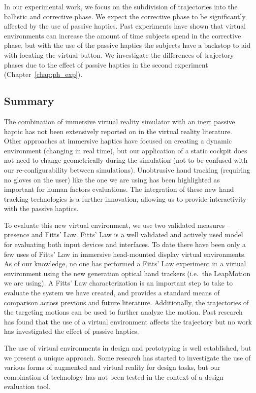 In our experimental work, we focus on the subdivision of trajectories into the ballistic and corrective phase.
We expect the corrective phase to be significantly affected by the use of passive haptics.
Past experiments have shown that virtual environments can increase the amount of time subjects spend in the corrective phase, but with the use of the passive haptics the subjects have a backstop to aid with locating the virtual button.
We investigate the differences of trajectory phases due to the effect of passive haptics in the second experiment (Chapter~\ref{chap:ph_exp}).

\subsection{Summary}
\label{summary}

The combination of immersive virtual reality simulator with an inert passive haptic has not been extensively reported on in the virtual reality literature.
Other approaches at immersive haptics have focused on creating a dynamic environment (changing in real time), but our application of a static cockpit does not need to change geometrically during the simulation (not to be confused with our re-configurability between simulations).
Unobtrusive hand tracking (requiring no gloves on the user) like the one we are using has been highlighted as important for human factors evaluations.
The integration of these new hand tracking technologies is a further innovation, allowing us to provide interactivity with the passive haptics.

To evaluate this new virtual environment, we use two validated measures -- presence and Fitts' Law.
Fitts' Law is a well validated and actively used model for evaluating both input devices and interfaces.
To date there have been only a few uses of Fitts' Law in immersive head-mounted display virtual environments.
As of our knowledge, no one has performed a Fitts' Law experiment in a virtual environment using the new generation optical hand trackers (i.e.\ the LeapMotion we are using).
A Fitts' Law characterization is an important step to take to evaluate the system we have created, and provides a standard means of comparison across previous and future literature.
Additionally, the trajectories of the targeting motions can be used to further analyze the motion.
Past research has found that the use of a virtual environment affects the trajectory but no work has investigated the effect of passive haptics.

The use of virtual environments in design and prototyping is well established, but we present a unique approach.
Some research has started to investigate the use of various forms of augmented and virtual reality for design tasks, but our combination of technology has not been tested in the context of a design evaluation tool.

